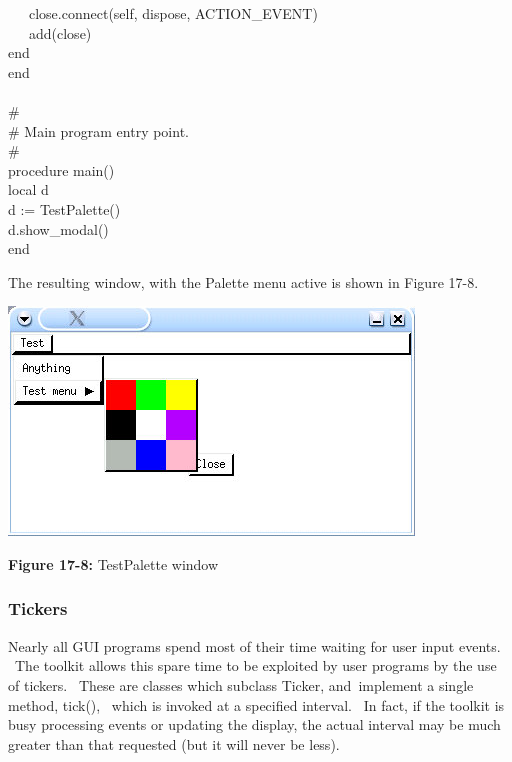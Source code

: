 {\>   \ \ \ close.connect(self, {\textquotedbl}dispose{\textquotedbl},
ACTION\_EVENT) \\
\>   \ \ \ add(close) \\
\>   end \\
end \\
\ \\
\# \\
\# Main program entry point. \\
\# \\
procedure main() \\
\>   local d \\
\>   d := TestPalette() \\
\>   d.show\_modal() \\
end
}

\bigskip

The resulting window, with the \textsf{Palette} menu active is shown in
Figure 17-8.

\begin{center}
\includegraphics[width=4.2398in,height=2.3953in]{ub-img/ub-img57.jpg}
\end{center}

{\sffamily\bfseries Figure 17-8:}
{\sffamily TestPalette window}

\subsubsection{Tickers}

Nearly all GUI programs spend most of their time waiting for user input
events. \ The toolkit allows this spare time to be exploited by user
programs by the use of {\textquotedbl}tickers{\textquotedbl}. \ These
are classes which subclass \textsf{Ticker}, and\texttt{ }implement a
single method, \textsf{tick()}, \ which is invoked at a specified
interval. \ In fact, if the toolkit is busy processing events or
updating the display, the actual interval may be much greater than that
requested (but it will never be less).

